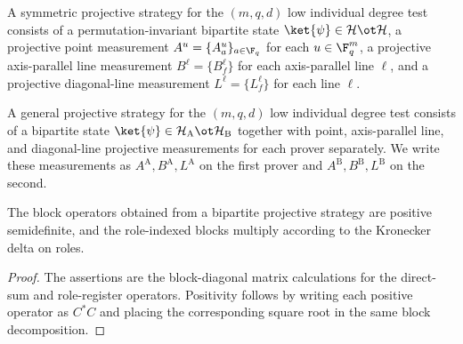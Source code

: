 \begin{definition}\label{def:symmetric-projective-strategy}
	\leanok
	A symmetric projective strategy for the $(m,q,d)$ low individual degree test consists of a permutation-invariant bipartite state $\ket{\psi} \in \mathcal H \ot \mathcal H$, a projective point measurement $A^u=\{A^u_a\}_{a \in \F_q}$ for each $u \in \F_q^m$, a projective axis-parallel line measurement $B^\ell=\{B^\ell_f\}$ for each axis-parallel line $\ell$, and a projective diagonal-line measurement $L^\ell=\{L^\ell_f\}$ for each line $\ell$.
\end{definition}

\begin{definition}\label{def:projective-strategy}
	\leanok
	A general projective strategy for the $(m,q,d)$ low individual degree test consists of a bipartite state $\ket{\psi} \in \mathcal H_{\mathrm A} \ot \mathcal H_{\mathrm B}$ together with point, axis-parallel line, and diagonal-line projective measurements for each prover separately. We write these measurements as $A^{\mathrm A}, B^{\mathrm A}, L^{\mathrm A}$ on the first prover and $A^{\mathrm B}, B^{\mathrm B}, L^{\mathrm B}$ on the second.
\end{definition}

\begin{lemma}\label{lem:bipartite-strategy-block-identities}
	\leanok
	The block operators obtained from a bipartite projective strategy are
	positive semidefinite, and the role-indexed blocks multiply according to the
	Kronecker delta on roles.
\end{lemma}
\begin{proof}
	\leanok
	The assertions are the block-diagonal matrix calculations for the direct-sum
	and role-register operators. Positivity follows by writing each positive
	operator as $C^*C$ and placing the corresponding square root in the same
	block decomposition.
\end{proof}

